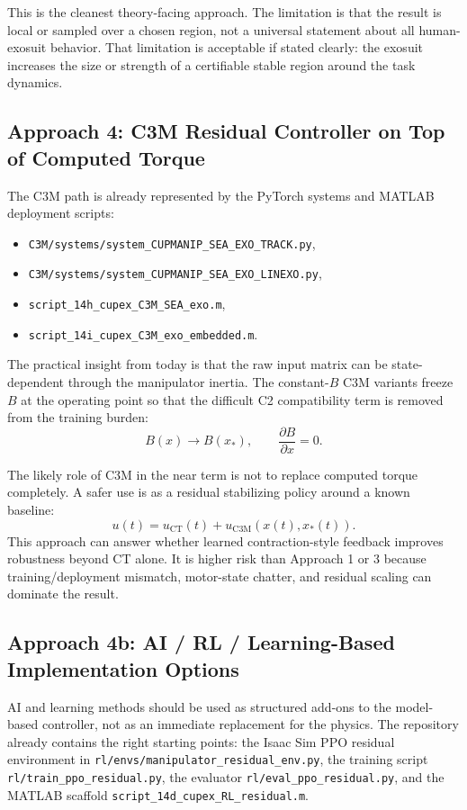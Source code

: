 \documentclass[11pt]{article}
\begin{document}
This is the cleanest theory-facing approach.  The limitation is that the result is local or sampled over a chosen region, not a universal statement about all human-exosuit behavior.  That limitation is acceptable if stated clearly: the exosuit increases the size or strength of a certifiable stable region around the task dynamics.

\subsection{Approach 4: C3M Residual Controller on Top of Computed Torque}
The C3M path is already represented by the PyTorch systems and MATLAB deployment scripts:
\begin{itemize}[leftmargin=1.5em]
    \item \texttt{C3M/systems/system\_CUPMANIP\_SEA\_EXO\_TRACK.py},
    \item \texttt{C3M/systems/system\_CUPMANIP\_SEA\_EXO\_LINEXO.py},
    \item \texttt{script\_14h\_cupex\_C3M\_SEA\_exo.m},
    \item \texttt{script\_14i\_cupex\_C3M\_exo\_embedded.m}.
\end{itemize}
The practical insight from today is that the raw input matrix can be state-dependent through the manipulator inertia.  The constant-\(B\) C3M variants freeze \(B\) at the operating point so that the difficult C2 compatibility term is removed from the training burden:
\begin{equation}
    B(x) \rightarrow B(x_\ast), \qquad \frac{\partial B}{\partial x}=0.
\end{equation}

The likely role of C3M in the near term is not to replace computed torque completely.  A safer use is as a residual stabilizing policy around a known baseline:
\begin{equation}
    u(t) = u_{\mathrm{CT}}(t) + u_{\mathrm{C3M}}(x(t),x_\ast(t)).
\end{equation}
This approach can answer whether learned contraction-style feedback improves robustness beyond CT alone.  It is higher risk than Approach 1 or 3 because training/deployment mismatch, motor-state chatter, and residual scaling can dominate the result.

\subsection{Approach 4b: AI / RL / Learning-Based Implementation Options}
AI and learning methods should be used as structured add-ons to the model-based controller, not as an immediate replacement for the physics.  The repository already contains the right starting points: the Isaac Sim PPO residual environment in \texttt{rl/envs/manipulator\_residual\_env.py}, the training script \texttt{rl/train\_ppo\_residual.py}, the evaluator \texttt{rl/eval\_ppo\_residual.py}, and the MATLAB scaffold \texttt{script\_14d\_cupex\_RL\_residual.m}.
\end{document}
